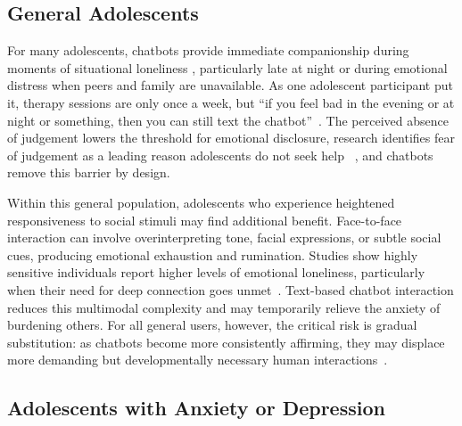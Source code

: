 \documentclass[manuscript]{acmart}
\begin{document}

\subsection{General Adolescents}

For many adolescents, chatbots provide immediate companionship during moments of situational
loneliness , particularly late at night or during emotional distress when peers and family
are unavailable. As one adolescent participant put it, therapy sessions are only once a week,
but ``if you feel bad in the evening or at night or something, then you can still text the
chatbot''~\cite{kuhlmeier2025designing}. The perceived absence of judgement lowers the
threshold for emotional disclosure, research identifies fear of judgement as a leading
reason adolescents do not seek help~\cite{NIHREvidence2021} , and chatbots remove this
barrier by design.

Within this general population, adolescents who experience heightened responsiveness to social
stimuli may find additional benefit. Face-to-face interaction can involve overinterpreting
tone, facial expressions, or subtle social cues, producing emotional exhaustion and
rumination. Studies show highly sensitive individuals report higher levels of emotional
loneliness, particularly when their need for deep connection goes
unmet~\cite{meckovsky2025highly}. Text-based chatbot interaction reduces this multimodal
complexity and may temporarily relieve the anxiety of burdening others. For all general users,
however, the critical risk is gradual substitution: as chatbots become more consistently
affirming, they may displace more demanding but developmentally necessary human
interactions~\cite{herbener2025lonely}.

\subsection{Adolescents with Anxiety or Depression}
\end{document}
